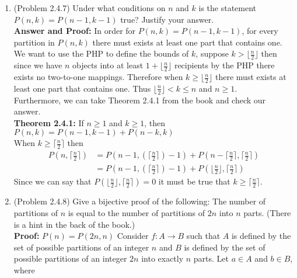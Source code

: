 \documentclass{amsart}
\begin{document}
\begin{enumerate}
\item (Problem 2.4.7) Under what conditions on $n$ and $k$ is the statement $P(n,k)=P(n-1,k-1)$ true? Justify your answer.\\

\noindent\textbf{Answer and Proof:} In order for $P(n,k)=P(n-1,k-1)$, for every partition in $P(n,k)$ there must exists at least one part that contains one. We want to use the PHP to define the bounds of $k$, suppose $k > \lfloor \frac{n}{2} \rfloor$ then since we have $n$ objects into at least $1+\lfloor \frac{n}{2} \rfloor$ recipients by the PHP there exists no two-to-one mappings. Therefore when $k \geq \lfloor \frac{n}{2} \rfloor$ there must exists at least one part that contains one. Thus $\lfloor \frac{n}{2} \rfloor < k \leq n$ and $n\geq 1$.\\ 

Furthermore, we can take Theorem 2.4.1 from the book and check our answer.\\

\noindent\textbf{Theorem 2.4.1: } If $n \geq 1$ and $k \geq 1$, then $P(n,k) = P(n-1,k-1) + P(n-k,k)$\\
When $k \geq  \lceil \frac{n}{2} \rceil$ then 
\begin{align}
P(n,\lceil \frac{n}{2} \rceil) &= P(n-1,(\lceil \frac{n}{2} \rceil)-1) + P(n-\lceil \frac{n}{2} \rceil,\lceil \frac{n}{2} \rceil)\\
 &= P(n-1,(\lceil \frac{n}{2} \rceil)-1) + P(\lfloor \frac{n}{2} \rfloor,\lceil \frac{n}{2} \rceil)
\end{align}
Since we can say that $P(\lfloor \frac{n}{2} \rfloor,\lceil \frac{n}{2} \rceil) = 0$ it must be true that $k \geq  \lceil \frac{n}{2} \rceil$.
\vspace{1in}






\item (Problem 2.4.8) Give a bijective proof of the following: The number of partitions of $n$ is equal to the number of partitions of $2n$ into $n$ parts. (There is a hint in the back of the book.)\\




\noindent\textbf{Proof:} $P(n) = P(2n,n)$ 
Consider $f: A \to B$ such that $A$ is defined by the set of possible partitions of an integer $n$ and $B$ is defined by the set of possible partitions of an integer $2n$ into exactly $n$ parts. Let $a \in A$ and $b \in B$, where


\end{enumerate}
\end{document}
